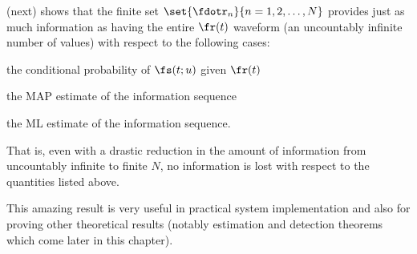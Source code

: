  (next) shows that the finite set
$\set{\fdotr_n}{n=1,2,\ldots,N}$ provides just as
much information as having the entire $\fr(t)$ waveform
(an uncountably infinite number of values) 
with respect to the following cases:
\begin{enume}
   \item the conditional probability of $\fs(t;u)$ given $\fr(t)$
   \item the MAP estimate of the information sequence
   \item the ML estimate of the information sequence.
\end{enume}
That is, even with a drastic reduction in the amount of information
from uncountably infinite to finite $N$,
no information is lost with respect to the quantities listed above.

This amazing result is very useful in practical system implementation
and also for proving other theoretical results
(notably estimation and detection theorems which come later 
in this chapter).


